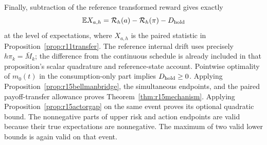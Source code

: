 Finally, subtraction of the reference transformed reward gives exactly
\[
 \mathbb E X_{a,h}=\mathcal R_h(a)-\mathcal R_h(\pi)-D_{\rm hold}
\]
at the level of expectations, where $X_{a,h}$ is the paired statistic
in Proposition~\ref{prop:r11transfer}. The reference internal drift
uses precisely $h\pi_k=\bar M_k$; the difference from the continuous
schedule is already included in that proposition's scalar quadrature
and reference-state account. Pointwise optimality of $m_0(t)$ in the
consumption-only part implies $D_{\rm hold}\geq0$. Applying
Proposition~\ref{prop:r15bellmanbridge}, the simultaneous endpoints,
and the paired payoff-transfer allowance proves
Theorem~\ref{thm:r15mechanism}. Applying
Proposition~\ref{prop:r15actorgap} on the same event proves its
optional quadratic bound. The nonnegative parts of upper risk and
action endpoints are valid because their true expectations are
nonnegative. The maximum of two valid lower bounds is again valid
on that event.
